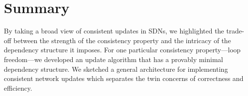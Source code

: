 \section{Summary}
\label{sec:conclusions}

By taking a broad view of consistent updates in SDNs, we highlighted the trade-off between the strength of the consistency property and the intricacy of the dependency structure it imposes.  For one particular consistency property---loop freedom---we developed an update algorithm that has a provably minimal dependency structure. We sketched a general architecture for implementing consistent network updates which separates the twin concerns of correctness and efficiency. 